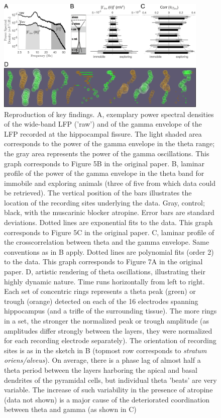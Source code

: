 \begin{figure}
	\centering
	\includegraphics[width=0.9\textwidth]{figures/figures_tenYears_02.png}
	\caption{Reproduction of key findings. A, exemplary power spectral densities of the wide-band LFP ('raw') and of the gamma envelope of the LFP recorded at the hippocampal fissure. The light shaded area corresponds to the power of the gamma envelope in the theta range; the gray area represents the power of the gamma oscillations. This graph corresponds to Figure 5B in the original paper. B, laminar profile of the power of the gamma envelope in the theta band for immobile and exploring  animals (three of five from which data could be retrieved). The vertical position of the bars illustrates the location of the recording sites underlying the data. Gray, control; black, with the muscarinic blocker atropine. Error bars are standard deviations. Dotted lines are exponential fits to the data. This graph corresponds to Figure 5C in the original paper. C, laminar profile of the crosscorrelation between theta and the gamma envelope. Same conventions as in B apply. Dotted lines are polynomial fits (order 2) to the data. This graph corresponds to Figure 7A in the original paper. D, artistic rendering of theta oscillations, illustrating their highly dynamic nature. Time runs horizontally from left to right. Each set of concentric rings represents a theta peak (green) or trough (orange) detected on each of the 16 electrodes spanning hippocampus (and a trifle of the surrounding tissue). The more rings in a set, the stronger the normalized peak or trough amplitude (as amplitudes differ strongly between the layers, they were normalized for each recording electrode separately). The orientation of recording sites is as in the sketch in B (topmost row corresponds to \textit{stratum oriens/alveus}). On average, there is a phase lag of almost half a theta period between the layers harboring the apical and basal dendrites of the pyramidal cells, but individual theta 'beats' are very variable. The increase of such variability in the presence of atropine (data not shown) is a major cause of the deteriorated coordination between theta and gamma (as shown in C)}
	\label{fig:repro}
\end{figure}



